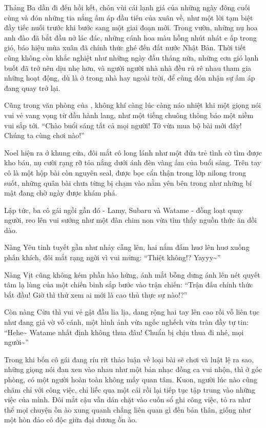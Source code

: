 \documentclass[../main.tex]{subfiles}
\begin{document}
Tháng Ba dần đi đến hồi kết, chôn vùi cái lạnh giá của những ngày đông cuối cùng và đón những tia nắng ấm áp đầu tiên của xuân về, như một lời tạm biệt đầy tiếc nuối trước khi bước sang một giai đoạn mới. Trong vườn, những nụ hoa anh đào đã bắt đầu nở lác đác, những cánh hoa màu hồng nhút nhát e ấp trong gió, báo hiệu mùa xuân đã chính thức ghé đến đất nước Nhật Bản. Thời tiết cũng không còn khắc nghiệt như những ngày đầu tháng nữa, những cơn gió lạnh buốt đã trở nên dịu nhẹ hơn, và người người nhà nhà đều rủ rê nhau tham gia những hoạt động, dù là ở trong nhà hay ngoài trời, để cùng đón nhận sự ấm áp đang quay trở lại.

Cũng trong văn phòng của \hll, không khí càng lúc càng náo nhiệt khi một giọng nói vui vẻ vang vọng từ đầu hành lang, như một tiếng chuông thông báo một niềm vui sắp tới. ``Chào buổi sáng tất cả mọi người! Tớ vừa mua bộ bài mới đây! Chúng ta cùng chơi nào!''


Noel hiện ra ở khung cửa, đôi mắt cô long lánh như một đứa trẻ tình cờ tìm được kho báu, nụ cười rạng rỡ tỏa nắng dưới ánh đèn vàng ấm của buổi sáng. Trên tay cô là một hộp bài còn nguyên seal, được bọc cẩn thận trong lớp nilong trong suốt, những quân bài chưa từng bị chạm vào nằm yên bên trong như những bí mật đang chờ ngày được khám phá.

Lập tức, ba cô gái ngồi gần đó - Lamy, Subaru và Watame - đồng loạt quay người, reo lên vui sướng như một đàn chim non vừa tìm thấy nguồn thức ăn dồi dào.

Nàng Yêu tinh tuyết gần như nhảy cẫng lên, hai nắm đấm huơ lên huơ xuống phấn khích, đôi mắt rạng ngời vì vui mừng: ``Thiệt không!? Yayyy\~{}''

Nàng Vịt cũng không kém phần hào hứng, ánh mắt bỗng dưng ánh lên nét quyết tâm lạ lùng của một chiến binh sắp bước vào trận chiến: ``Trận đấu chính thức bắt đầu! Giờ thì thử xem ai mới là cao thủ thực sự nào!?''

Còn nàng Cừu thì vui vẻ gật đầu lia lịa, dang rộng hai tay lên cao rồi vỗ liên tục như đang giả vờ vỗ cánh, một hình ảnh vừa ngốc nghếch vừa tràn đầy tự tin: ``Hehe\~{} Watame nhất định không thua đâu! Chuẩn bị chịu thua đi nhé, mọi người\~{}''

Trong khi bốn cô gái đang ríu rít thảo luận về loại bài sẽ chơi và luật lệ ra sao, những giọng nói đan xen vào nhau như một bản nhạc đồng ca vui nhộn, thì ở góc phòng, có một người hoàn toàn không mấy quan tâm. Kuon, người lúc nào cũng chăm chỉ với công việc, chỉ liếc qua một cái rồi lại tiếp tục tập trung vào những việc của mình. Đôi mắt cậu vẫn dán chặt vào cuốn sổ ghi công việc, tỏ ra như thể mọi chuyện ồn ào xung quanh chẳng liên quan gì đến bản thân, giống như một hòn đảo cô độc giữa đại dương ồn ào.
\end{document}
